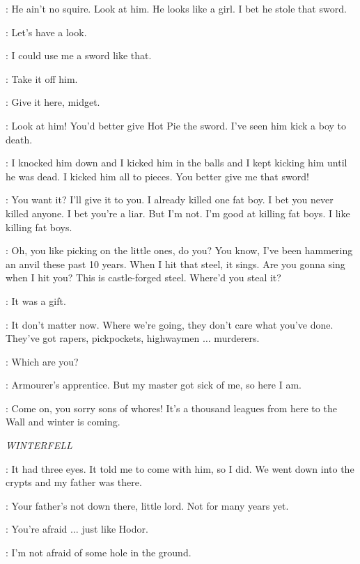 \HOTPIE: He ain't no squire. Look at him. He looks like a girl. I bet he stole that sword. 

\LOMMY: Let's have a look. 

\HOTPIE: I could use me a sword like that. 

\LOMMY: Take it off him. 

\HOTPIE: Give it here, midget. 

\LOMMY: Look at him! You'd better give Hot Pie the sword. I've seen him kick a boy to death. 

\HOTPIE: I knocked him down and I kicked him in the balls and I kept kicking him until he was dead. I kicked him all to pieces. You better give me that sword! 

\ARYA: You want it? I'll give it to you. I already killed one fat boy. I bet you never killed anyone. I bet you're a liar. But I'm not. I'm good at killing fat boys. I like killing fat boys. 

\GENDRY: Oh, you like picking on the little ones, do you? You know, I've been hammering an anvil these past 10 years. When I hit that steel, it sings. Are you gonna sing when I hit you?  This is castle-forged steel. Where'd you steal it? 

\ARYA: It was a gift. 

\GENDRY: It don't matter now. Where we're going, they don't care what you've done. They've got rapers, pickpockets, highwaymen $\ldots$ murderers. 

\ARYA: Which are you? 

\GENDRY: Armourer's apprentice. But my master got sick of me, so here I am. 

\YOREN: Come on, you sorry sons of whores! It's a thousand leagues from here to the Wall and winter is coming.


\scene

\textit{WINTERFELL} 


\BRAN: It had three eyes. It told me to come with him, so I did. We went down into the crypts and my father was there. 

\OSHA: Your father's not down there, little lord. Not for many years yet. 

\BRAN: You're afraid $\ldots$ just like Hodor. 

\OSHA: I'm not afraid of some hole in the ground. 

